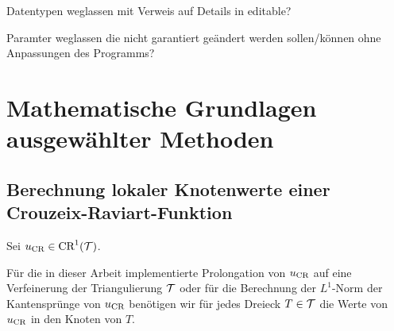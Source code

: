 Datentypen weglassen mit Verweis auf Details in editable?

Paramter weglassen die nicht garantiert geändert werden sollen/können ohne
Anpassungen des Programms?


\section{Mathematische Grundlagen ausgewählter Methoden}
\label{sec:mathematicalBasicsForMethods}


\subsection{Berechnung lokaler Knotenwerte einer Crouzeix-Raviart-Funktion}

Sei $u_\textup{CR}\in\textup{CR}^1(\mathcal{T})$.

Für die in dieser Arbeit implementierte Prolongation von $u_\textup{CR}$ auf eine
Verfeinerung der Triangulierung $\mathcal{T}$ oder für die Berechnung der $L^1$-Norm
der Kantensprünge von $u_\textup{CR}$ benötigen wir für jedes Dreieck $T\in\mathcal{T}$ die
Werte von $u_\textup{CR}$ in den Knoten von $T$. 

